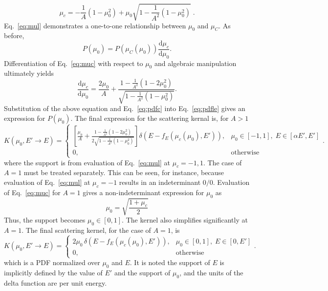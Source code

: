 \documentclass[12pt]{article}
\renewcommand{\d}{\mathrm{d}}
\newenvironment{solution}[1][Solution]{\begin{trivlist}
\item[\hskip \labelsep {\bfseries #1} {\hspace{-0.2em}\bfseries:}]\hspace{0.3in}\newline}{\end{trivlist}}
\begin{document}
\begin{solution}
\begin{equation}
    \mu_c = -\frac{1}{A}(1-\mu_0^2) + \mu_0\sqrt{1-\frac{1}{A^2}(1-\mu_0^2)}\;.
\end{equation}
Eq.~\eqref{eq:mul} demonstrates a one-to-one relationship between $\mu_0$ and
$\mu_C$.  As before,
\begin{equation}\label{eq:pdfle}
P(\mu_0) = P\left(\mu_C(\mu_0)\right)\frac{\d \mu_c}{\d \mu_0}.
\end{equation}
Differentiation of Eq.~\eqref{eq:muc} with respect to $\mu_0$ and algebraic
manipulation ultimately yields
\begin{equation}
    \frac{\d \mu_c}{\d \mu_0} = \frac{2 \mu_0}{A} + \frac{1 - \frac{1}{A^2}(1 -
2\mu_0^2)}{\sqrt{1 - \frac{1}{A^2}(1 - \mu_0^2)}}.
\end{equation}
Substitution of the above equation and Eq.~\eqref{eq:pdfc} into Eq.~\eqref{eq:pdfle}
gives an expression for $P(\mu_0)$. The final expression for the scattering kernal
is, for $A>1$
\begin{equation}
    \boxed{
K(\mu_0,E'\rightarrow E) = \left\{\begin{matrix} \displaystyle
\left[\frac{\mu_0}{A} + \frac{1 - \frac{1}{A^2}(1 -
2\mu_0^2)}{2\sqrt{1 - \frac{1}{A^2}(1 -
\mu_0^2)}}\right]{\delta(E-f_E\left(\mu_c(\mu_0),E'\right))}, &
\mu_0\in[-1,1],\; E\in[\alpha E',E'] \\ 
 0, & \text{otherwise}
\end{matrix}\right. 
}.
\end{equation}
where the support is from evaluation of Eq.~\eqref{eq:mul} at $\mu_c=-1,1$.  The case
of $A=1$ must be treated separately. This can be seen, for instance, because evaluation of
Eq.~\eqref{eq:mul} at $\mu_c=-1$ results in an indeterminant $0/0$. Evaluation of
Eq.~\eqref{eq:muc} for $A=1$ gives a non-indeterminant expression for $\mu_0$ as
\begin{equation}\label{eq:mu0}
    \mu_0 = \sqrt{\frac{1+\mu_c}{2}}
\end{equation}
Thus, the support becomes $\mu_0 \in [0,1]$.  The kernel also simplifies significantly at
$A=1$.  The final scattering kernel, for the case of $A=1$, is
\begin{equation}\label{answer}
\boxed{
K(\mu_0,E'\rightarrow E) = \left\{\begin{matrix}
    2\mu_0\,\delta(E-f_E\left(\mu_c(\mu_0),E'\right)), & \mu_0\in[0,1],\;
    E\in[0,E'] \\ 
 0, & \text{otherwise}
\end{matrix}\right. 
}.
\end{equation}
which is a PDF normalized over $\mu_0$ and $E$. It is noted the support of $E$ is implicitly
defined by the value of $E'$ and the support of $\mu_0$, and the units of the delta
function are per unit energy.


\end{solution}
\end{document}
